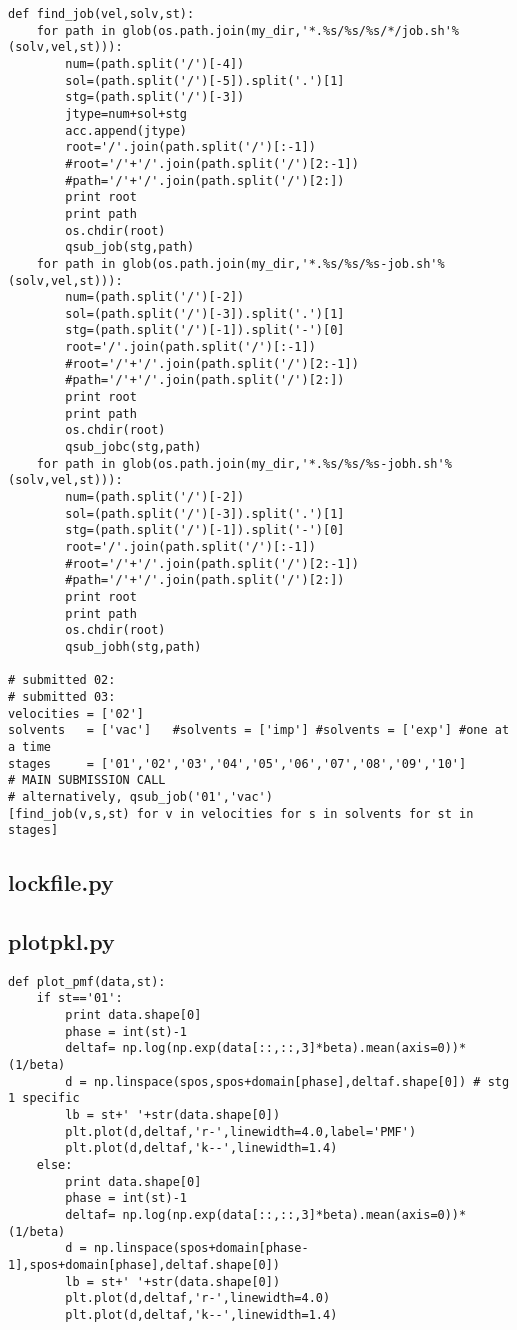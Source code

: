 \documentclass[11pt]{article}
\begin{document}
\begin{verbatim}
def find_job(vel,solv,st):
    for path in glob(os.path.join(my_dir,'*.%s/%s/%s/*/job.sh'%(solv,vel,st))):
        num=(path.split('/')[-4])
        sol=(path.split('/')[-5]).split('.')[1]
        stg=(path.split('/')[-3])
        jtype=num+sol+stg
        acc.append(jtype)
        root='/'.join(path.split('/')[:-1])
        #root='/'+'/'.join(path.split('/')[2:-1])
        #path='/'+'/'.join(path.split('/')[2:])
        print root
        print path
        os.chdir(root)
        qsub_job(stg,path)
    for path in glob(os.path.join(my_dir,'*.%s/%s/%s-job.sh'%(solv,vel,st))):
        num=(path.split('/')[-2])
        sol=(path.split('/')[-3]).split('.')[1]
        stg=(path.split('/')[-1]).split('-')[0]
        root='/'.join(path.split('/')[:-1])
        #root='/'+'/'.join(path.split('/')[2:-1])
        #path='/'+'/'.join(path.split('/')[2:])
        print root
        print path
        os.chdir(root)
        qsub_jobc(stg,path)
    for path in glob(os.path.join(my_dir,'*.%s/%s/%s-jobh.sh'%(solv,vel,st))):
        num=(path.split('/')[-2])
        sol=(path.split('/')[-3]).split('.')[1]
        stg=(path.split('/')[-1]).split('-')[0]
        root='/'.join(path.split('/')[:-1])
        #root='/'+'/'.join(path.split('/')[2:-1])
        #path='/'+'/'.join(path.split('/')[2:])
        print root
        print path
        os.chdir(root)
        qsub_jobh(stg,path)

# submitted 02:
# submitted 03:
velocities = ['02']
solvents   = ['vac']   #solvents = ['imp'] #solvents = ['exp'] #one at a time
stages     = ['01','02','03','04','05','06','07','08','09','10']
# MAIN SUBMISSION CALL
# alternatively, qsub_job('01','vac')
[find_job(v,s,st) for v in velocities for s in solvents for st in stages]
\end{verbatim}



\subsection{lockfile.py}




\subsection{plotpkl.py}
\begin{verbatim}
def plot_pmf(data,st):
    if st=='01':
        print data.shape[0]
        phase = int(st)-1
        deltaf= np.log(np.exp(data[::,::,3]*beta).mean(axis=0))*(1/beta)
        d = np.linspace(spos,spos+domain[phase],deltaf.shape[0]) # stg 1 specific
        lb = st+' '+str(data.shape[0])
        plt.plot(d,deltaf,'r-',linewidth=4.0,label='PMF')
        plt.plot(d,deltaf,'k--',linewidth=1.4)
    else:
        print data.shape[0]
        phase = int(st)-1
        deltaf= np.log(np.exp(data[::,::,3]*beta).mean(axis=0))*(1/beta)
        d = np.linspace(spos+domain[phase-1],spos+domain[phase],deltaf.shape[0])
        lb = st+' '+str(data.shape[0])
        plt.plot(d,deltaf,'r-',linewidth=4.0)
        plt.plot(d,deltaf,'k--',linewidth=1.4)
\end{verbatim}
\end{document}
